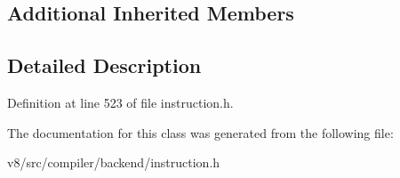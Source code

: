 \subsection*{Additional Inherited Members}


\subsection{Detailed Description}


Definition at line 523 of file instruction.\+h.



The documentation for this class was generated from the following file\+:\begin{DoxyCompactItemize}
\item 
v8/src/compiler/backend/instruction.\+h\end{DoxyCompactItemize}
